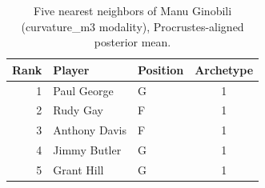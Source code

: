 \begin{table}[htbp]
  \centering\small
  \begin{tabular}{rllc}
    \toprule
    Rank & Player & Position & Archetype \\
    \midrule
    1 & Paul George & G & 1 \\
    2 & Rudy Gay & F & 1 \\
    3 & Anthony Davis & F & 1 \\
    4 & Jimmy Butler & G & 1 \\
    5 & Grant Hill & G & 1 \\
    \bottomrule
  \end{tabular}
  \caption{Five nearest neighbors of Manu Ginobili (curvature_m3 modality), Procrustes-aligned posterior mean.}
  \label{tab:Manu_Ginobili_neighbors_curvature_m3}
\end{table}

